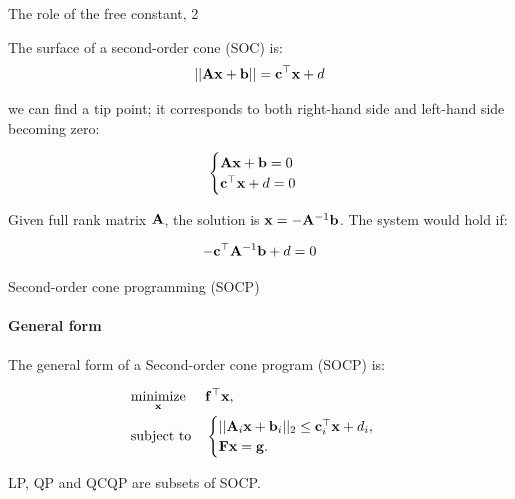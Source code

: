 \documentclass{beamer}
\begin{document}
\begin{frame}{The role of the free constant, 2}
	\begin{flushleft}
		
		The surface of a second-order cone (SOC) is:
		\begin{equation}
			||\mathbf{A}\mathbf{x}+\mathbf{b}|| = \mathbf{c}^\top \mathbf{x} + d
		\end{equation}
		
		we can find a tip point; it corresponds to both right-hand side and left-hand side becoming zero:
		
		\begin{equation}
			\begin{cases}
				\mathbf{A}\mathbf{x}+\mathbf{b} = 0 \\
				\mathbf{c}^\top \mathbf{x} + d = 0
			\end{cases}
		\end{equation}
		
		Given full rank matrix $\mathbf{A}$, the solution is $\mathbf{x} = -\mathbf{A}^{-1}\mathbf{b}$. The system would hold if:
		
		\begin{equation}
			-\mathbf{c}^\top \mathbf{A}^{-1}\mathbf{b} + d = 0
		\end{equation}
		
		
	\end{flushleft}
\end{frame}







\begin{frame}{Second-order cone programming (SOCP)}
\framesubtitle{General form}
\begin{flushleft}


The general form of a Second-order cone program (SOCP) is:

%
\begin{equation}
\begin{aligned}
& \underset{\mathbf{x}}{\text{minimize}}
& & \mathbf{f}^\top\mathbf{x}, \\
& \text{subject to}
& & \begin{cases}
    ||\mathbf{A}_i\mathbf{x} + \mathbf{b}_i||_2 \leq 
     \mathbf{c}_i^\top \mathbf{x} + d_i, \\
    \mathbf{F}\mathbf{x} = \mathbf{g}.
    \end{cases}
\end{aligned}
\end{equation}

LP, QP and QCQP are subsets of SOCP.
 
\end{flushleft}
\end{frame}
\end{document}
